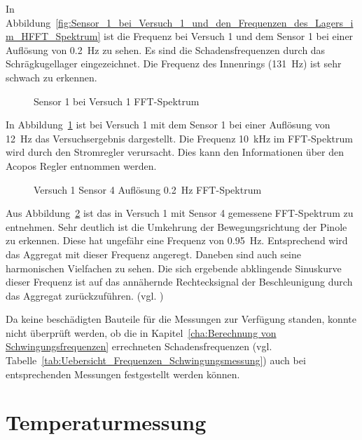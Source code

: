 In Abbildung~\ref{fig:Sensor_1_bei_Versuch_1_und_den_Frequenzen_des_Lagers_im_HFFT_Spektrum} ist die Frequenz bei Versuch 1 und dem Sensor 1 bei einer Auflösung von \SI{0.2}{\hertz} zu sehen. Es sind die Schadensfrequenzen durch das Schrägkugellager eingezeichnet. Die Frequenz des Innenrings (\SI{131}{\hertz}) ist sehr schwach zu erkennen.

\begin{figure}[H]
\centering

\caption{Sensor 1 bei Versuch 1 FFT-Spektrum}
\label{fig:Sensor 1 bei Versuch 1 FFT Spektrum}
\end{figure}

In Abbildung~\ref{fig:Sensor 1 bei Versuch 1 FFT Spektrum} ist bei Versuch 1 mit dem Sensor 1 bei einer Auflösung von \SI{12}{\hertz} das Versuchsergebnis dargestellt.  Die Frequenz \SI{10}{\kilo\hertz} im FFT-Spektrum wird durch den Stromregler verursacht. Dies kann den Informationen über den Acopos Regler entnommen werden. \cite{BundR2007}


\begin{figure}[H]
\centering

\caption{Versuch 1 Sensor 4 Auflösung \SI{0,2}{\hertz} FFT-Spektrum}
\label{fig:Versuch 1 Sensor 4 Aufloesung}
\end{figure}

Aus Abbildung~\ref{fig:Versuch 1 Sensor 4 Aufloesung} ist das in Versuch 1 mit Sensor 4  gemessene FFT-Spektrum zu entnehmen. Sehr deutlich ist die Umkehrung der Bewegungsrichtung der Pinole zu erkennen. Diese hat ungefähr eine Frequenz von \SI{0,95}{\hertz}. Entsprechend wird das Aggregat mit dieser Frequenz angeregt. Daneben sind auch seine harmonischen Vielfachen zu sehen. Die sich ergebende abklingende Sinuskurve dieser Frequenz ist auf das annähernde Rechtecksignal der Beschleunigung durch das Aggregat zurückzuführen. (vgl. \cite{schnorrenberg1990spektrumanalyse})


Da keine beschädigten Bauteile für die Messungen zur Verfügung standen, konnte nicht überprüft werden, ob die in Kapitel~\ref{cha:Berechnung von Schwingungsfrequenzen} errechneten Schadensfrequenzen (vgl. Tabelle~\ref{tab:Uebersicht_Frequenzen_Schwingungsmessung}) auch bei entsprechenden Messungen festgestellt werden können.

 


\section{Temperaturmessung}




